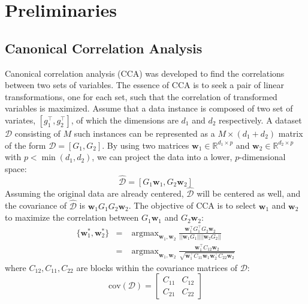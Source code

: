 \documentclass[a4paper]{article}
\newcommand{\argmax}{\mathop\mathrm{argmax}}
\begin{document}
\section{Preliminaries}
\label{sec:pre}

\subsection{Canonical Correlation Analysis}
\label{subsec:CCA}
Canonical correlation analysis (CCA) \citep{HardoonSS04} was developed to find the correlations between two sets of variables. The essence of CCA is to seek a pair of 
linear transformations, one for each set, such that the correlation of transformed variables is maximized. 
Assume that a data instance is composed of two set of variates, $[g_1^\top,g_2^\top]$, of which the dimensions are $d_1$ and $d_2$ respectively.  
A dataset $\mathcal{D}$ consisting of $M$ such instances can be represented as a $M\times (d_1+d_2)$ matrix of the form $\mathcal{D}=[G_1,G_2]$. By using two matrices 
$\mathbf{w}_1\in\mathbb{R}^{d_1\times p}$ and $\mathbf{w}_2\in\mathbb{R}^{d_2\times p}$ with $p<\min(d_1,d_2)$, we can project the data into a lower, $p$-dimensional space:
\begin{equation}
    \hat{\mathcal{D}}= [G_1\mathbf{w}_1, G_2\mathbf{w}_2] 
\end{equation}
Assuming the original data are already centered, $\hat{\mathcal{D}}$ will be centered as well, and the covariance of $\hat{\mathcal{D}}$ is $\mathbf{w}_1 G_1 G_2 \mathbf{w}_2$. 
The objective of CCA is to select $\mathbf{w}_1$ and $\mathbf{w}_2$ to maximize the correlation between $G_1\mathbf{w}_1$ and $G_2\mathbf{w}_2$:
\begin{equation}
    \begin{array}{rcl}
        \{\mathbf{w}_1^*,\mathbf{w}_2^*\} &= &\displaystyle\argmax_{\mathbf{w}_1,\mathbf{w}_2} \frac{\mathbf{w}_1^\top G_1^\top G_2 \mathbf{w}_2}{||\mathbf{w}_1 G_1||||\mathbf{w}_2 G_2||} \\ 
                                          &= & \displaystyle\argmax_{\mathbf{w}_1,\mathbf{w}_2} \frac{\mathbf{w}_1^\top C_{12} \mathbf{w}_2}{\sqrt{\mathbf{w}_1^\top C_{11} \mathbf{w}_1 \mathbf{w}_2^\top C_{22} \mathbf{w}_2}}
    \end{array}
    \label{equ:CCA1}
\end{equation}
where $C_{12}, C_{11}, C_{22}$ are blocks within the covariance matrices of $\mathcal{D}$:  
\begin{equation}
    \mathrm{cov}(\mathcal{D})=\left[\begin{array}{cc}
            C_{11} & C_{12} \\
            C_{21} & C_{22}
        \end{array}
    \right]
\end{equation}
\end{document}
